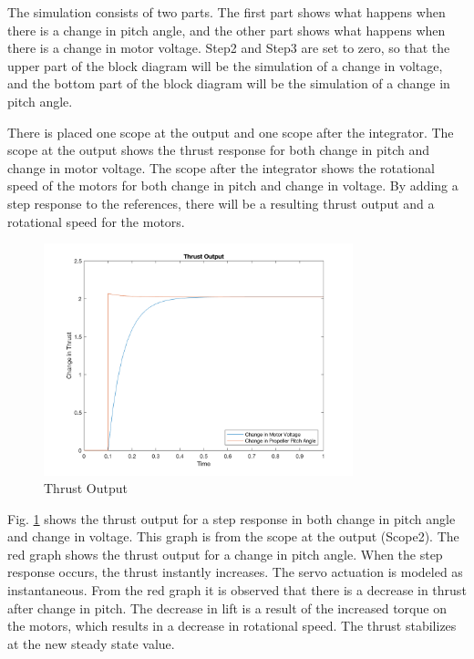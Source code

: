The simulation consists of two parts. The first part shows what happens when there is a change in pitch angle, and the other part shows what happens when there is a change in motor voltage. Step2 and Step3 are set to zero, so that the upper part of the block diagram will be the simulation of a change in voltage, and the bottom part of the block diagram will be the simulation of a change in pitch angle. \bigskip

There is placed one scope at the output and one scope after the integrator. The scope at the output shows the thrust response for both change in pitch and change in motor voltage. The scope after the integrator shows the rotational speed of the motors for both change in pitch and change in voltage. By adding a step response to the references, there will be a resulting thrust output and a rotational speed for the motors. \bigskip

\begin{figure}[H]
    \centering
    \includegraphics[width = 0.8\textwidth]{VAPIQ-PICTURES/thrustoutput.png}
    \caption{Thrust Output}
    \label{fig:thrust}
\end{figure}\bigskip

Fig. \ref{fig:thrust} shows the thrust output for a step response in both change in pitch angle and change in voltage. This graph is from the scope at the output (Scope2). The red graph shows the thrust output for a change in pitch angle. When the step response occurs, the thrust instantly increases. The servo actuation is modeled as instantaneous. From the red graph it is observed that there is a decrease in thrust after change in pitch. The decrease in lift is a result of the increased torque on the motors, which results in a decrease in rotational speed. The thrust stabilizes at the new steady state value. \bigskip

